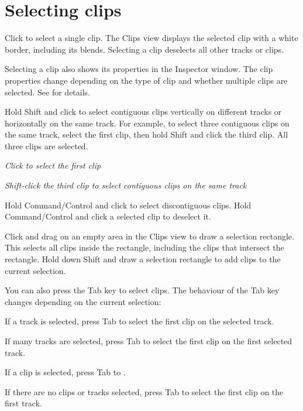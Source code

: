 \chapter{Selecting clips}
\hypertarget{md__hey_tea_9_2_library_2_package_cache_2com_8unity_8timeline_0d1_87_85_2_documentation_0i_2clp__select}{}\label{md__hey_tea_9_2_library_2_package_cache_2com_8unity_8timeline_0d1_87_85_2_documentation_0i_2clp__select}
\label{md__hey_tea_9_2_library_2_package_cache_2com_8unity_8timeline_0d1_87_85_2_documentation_0i_2clp__select_autotoc_md4625}%
%
 Click to select a single clip. The Clips view displays the selected clip with a white border, including its blends. Selecting a clip deselects all other tracks or clips.

Selecting a clip also shows its properties in the Inspector window. The clip properties change depending on the type of clip and whether multiple clips are selected. See  for details.

Hold Shift and click to select contiguous clips vertically on different tracks or horizontally on the same track. For example, to select three contiguous clips on the same track, select the first clip, then hold Shift and click the third clip. All three clips are selected.



{\itshape Click to select the first clip}



{\itshape Shift-\/click the third clip to select contiguous clips on the same track}

Hold Command/\+Control and click to select discontiguous clips. Hold Command/\+Control and click a selected clip to deselect it.

Click and drag on an empty area in the Clips view to draw a selection rectangle. This selects all clips inside the rectangle, including the clips that intersect the rectangle. Hold down Shift and draw a selection rectangle to add clips to the current selection.

You can also press the Tab key to select clips. The behaviour of the Tab key changes depending on the current selection\+:


\begin{DoxyItemize}
\item If a track is selected, press Tab to select the first clip on the selected track.
\item If many tracks are selected, press Tab to select the first clip on the first selected track.
\item If a clip is selected, press Tab to .
\item If there are no clips or tracks selected, press Tab to select the first clip on the first track.
\end{DoxyItemize}

